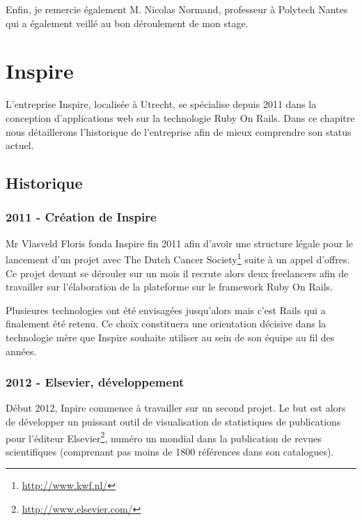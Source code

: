 \documentclass[12pt,a4paper]{book}
\begin{document}

Enfin, je remercie également M. Nicolas Normand, professeur à Polytech Nantes qui a également veillé au bon déroulement de mon stage.


\chapter{Inspire}

L'entreprise Inspire, localisée à Utrecht, se spécialise depuis 2011 dans la conception d'applications web sur la technologie Ruby On Rails. Dans ce chapitre nous détaillerons l'historique de l'entreprise afin de mieux comprendre son status actuel.

\section{Historique}
\subsection{2011 - Création de Inspire}

Mr Vlasveld Floris fonda Inspire fin 2011 afin d'avoir une structure légale pour le lancement d'un projet avec The Dutch Cancer Society\footnote{\url{http://www.kwf.nl/}} suite à un appel d'offres. Ce projet devant se dérouler sur un mois il recrute alors deux freelancers afin de travailler sur l'élaboration de la plateforme sur le framework Ruby On Rails.

Plusieures technologies ont été envisagées jusqu'alors mais c'est Rails qui a finalement été retenu. Ce choix constituera une orientation décisive dans la technologie mère que Inspire souhaite utiliser au sein de son équipe au fil des années.

\subsection{2012 - Elsevier, développement}

Début 2012, Inpire commence à travailler sur un second projet. Le but est alors de développer un puissant outil de visualisation de statistiques de publications pour l'éditeur Elsevier\footnote{\url{http://www.elsevier.com/}}, numéro un mondial dans la publication de revues scientifiques (comprenant pas moins de 1800 références dans son catalogues).
\end{document}
